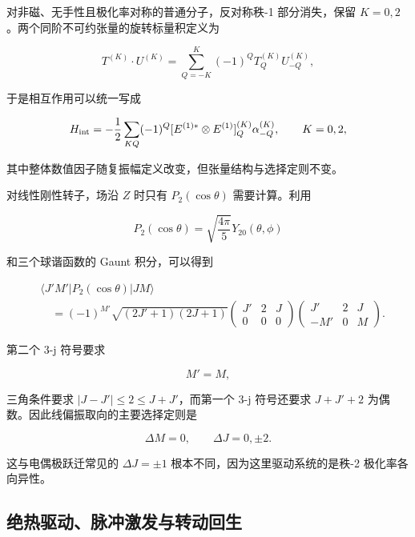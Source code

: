 对非磁、无手性且极化率对称的普通分子，反对称秩-1 部分消失，保留 \(K=0,2\)。两个同阶不可约张量的旋转标量积定义为

\[
T^{(K)}\!\cdot U^{(K)}
=\sum_{Q=-K}^{K}(-1)^Q T^{(K)}_QU^{(K)}_{-Q},
\]

于是相互作用可以统一写成

\begin{equation}
H_{\rm int}
=-\frac12\sum_{KQ}(-1)^Q
[E^{(1)*}\otimes E^{(1)}]^{(K)}_Q
\alpha^{(K)}_{-Q},
\qquad K=0,2,
\label{eq:polarizability-tensor-coupling}
\end{equation}

其中整体数值因子随复振幅定义改变，但张量结构与选择定则不变。

对线性刚性转子，场沿 \(Z\) 时只有 \(P_2(\cos\theta)\) 需要计算。利用

\[
P_2(\cos\theta)=\sqrt{\frac{4\pi}{5}}Y_{20}(\theta,\phi)
\]

和三个球谐函数的 Gaunt 积分，可以得到

\begin{equation}
\begin{aligned}
&\langle J'M'|P_2(\cos\theta)|JM\rangle\\
&\quad=(-1)^{M'}
\sqrt{(2J'+1)(2J+1)}
\begin{pmatrix}
J'&2&J\\0&0&0
\end{pmatrix}
\begin{pmatrix}
J'&2&J\\-M'&0&M
\end{pmatrix}.
\end{aligned}
\label{eq:alignment-p2-matrix-element}
\end{equation}

第二个 3-j 符号要求

\[
M'=M,
\]

三角条件要求 \(|J-J'|\le2\le J+J'\)，而第一个 3-j 符号还要求 \(J+J'+2\) 为偶数。因此线偏振取向的主要选择定则是

\begin{equation}
\Delta M=0,
\qquad
\Delta J=0,\pm2.
\label{eq:alignment-selection-rule}
\end{equation}

这与电偶极跃迁常见的 \(\Delta J=\pm1\) 根本不同，因为这里驱动系统的是秩-2 极化率各向异性。

\subsection{绝热驱动、脉冲激发与转动回生}

